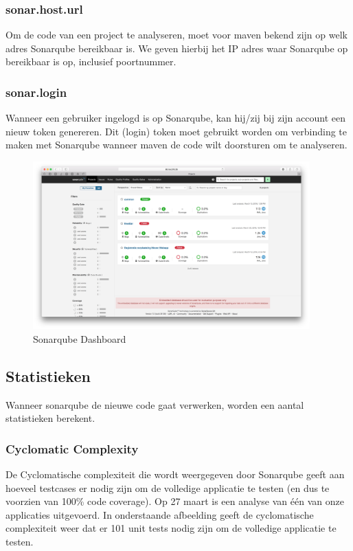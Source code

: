 \subsubsection{sonar.host.url}
Om de code van een project te analyseren, moet voor maven bekend zijn op welk adres Sonarqube bereikbaar is. We geven hierbij het IP adres waar Sonarqube op bereikbaar is op, inclusief poortnummer.
\subsubsection{sonar.login}
Wanneer een gebruiker ingelogd is op Sonarqube, kan hij/zij bij zijn account een nieuw token genereren. Dit (login) token moet gebruikt worden om verbinding te maken met Sonarqube wanneer maven de code wilt doorsturen om te analyseren.

\begin{figure}[H]
	\centering
	\includegraphics[width=0.95\textwidth]{img/SonarqubeDashboard.png}
	\caption{Sonarqube Dashboard}
	\label{fig:SonarqubeDashboard}
\end{figure}

\subsection{Statistieken}
Wanneer sonarqube de nieuwe code gaat verwerken, worden een aantal statistieken berekent.

\subsubsection{Cyclomatic Complexity}
De Cyclomatische complexiteit die wordt weergegeven door Sonarqube geeft aan hoeveel testcases er nodig zijn om de volledige applicatie te testen (en dus te voorzien van 100\% code coverage).
Op 27 maart is een analyse van één van onze applicaties uitgevoerd. In onderstaande afbeelding geeft de cyclomatische complexiteit weer dat er 101 unit tests nodig zijn om de volledige applicatie te testen.

